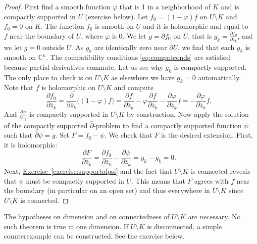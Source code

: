 \documentclass[12pt,openany]{book}
\newcommand{\C}{{\mathbb{C}}}
\theoremstyle{plain}
\theoremstyle{remark}
\theoremstyle{definition}
\theoremstyle{exercise}
\theoremstyle{example}
\newcommand{\exerciseref}[1]{\hyperref[#1]{Exercise~\ref*{#1}}}
\begin{document}
\begin{proof}
First find a smooth function $\varphi$ that is 1 in a neighborhood of
$K$ and is compactly supported in $U$ (exercise below).  Let
$f_0 = (1-\varphi)f$ on $U \setminus K$ and $f_0 = 0$ on $K$.  The function $f_0$
is smooth on $U$ and it is holomorphic
and equal to $f$ near the boundary of $U$, where $\varphi$ is 0.
We let $g = \bar{\partial} f_0$ on $U$, that is $g_k = \frac{\partial
f_0}{\partial \bar{z}_k}$,
and we let $g=0$ outside $U$.
As $g_k$ are identically zero near $\partial U$, we find that each
$g_k$ is smooth on $\C^n$.
The compatibility conditions
\eqref{eq:compatconds} are satisfied
because partial derivatives commute.
Let us see why $g_k$ is compactly supported.  The
only place to check is on $U \setminus K$ as elsewhere we have $g_k = 0$
automatically.  Note that $f$ is holomorphic on $U \setminus K$ and compute
\begin{equation*}
\frac{\partial f_0}{\partial \bar{z}_k}
=
\frac{\partial }{\partial \bar{z}_k}
\bigl((1-\varphi)f\bigr)
=
\frac{\partial f}{\partial \bar{z}_k}
- \varphi \frac{\partial f}{\partial \bar{z}_k}
- \frac{\partial \varphi}{\partial \bar{z}_k} f
=
- \frac{\partial \varphi}{\partial \bar{z}_k} f .
\end{equation*}
And $\frac{\partial \varphi}{\partial \bar{z}_k}$ is compactly supported in
$U \setminus K$ by construction.
Now apply the solution of the compactly supported $\bar{\partial}$-problem
to find a
compactly supported function $\psi$ such that $\bar{\partial}\psi = g$.
Set $F = f_0 - \psi$.  We check that $F$ is the desired
extension.  First, it is holomorphic:
\begin{equation*}
\frac{\partial F}{\partial \bar{z}_k}
=
\frac{\partial f_0}{\partial \bar{z}_k}
-
\frac{\partial \psi}{\partial \bar{z}_k}
=
g_k
-
g_k
= 0 .
\end{equation*}
Next, \exerciseref{exercise:supportofpsi} and the fact that $U \setminus
K$ is connected reveals that $\psi$ must be compactly supported in $U$.
This means that $F$ agrees with $f$ near the boundary (in particular
on an open set) and thus everywhere in $U \setminus K$ since $U \setminus K$
is connected.
\end{proof}

The hypotheses on dimension and on connectedness of $U \setminus K$
are necessary.
No such theorem is true in one dimension.
If $U \setminus K$ is disconnected, a simple
counterexample can be constructed.
See the exercise below.
\end{document}
